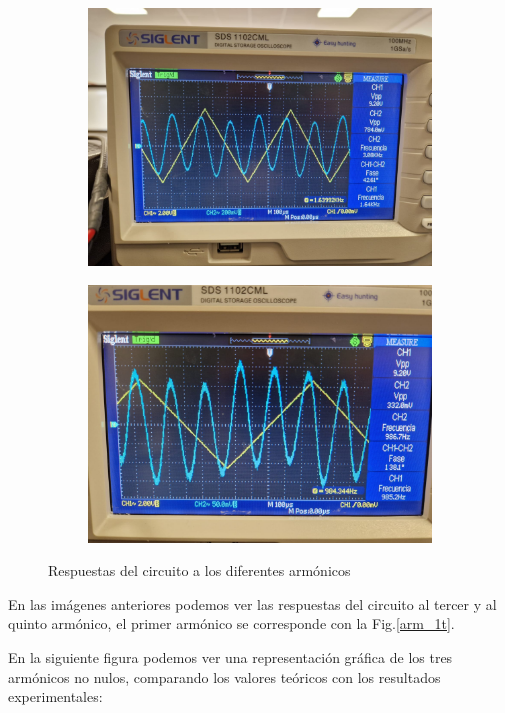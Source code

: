 \documentclass[a4paper,12pt,titlepage]{article}
\begin{document}
\begin{figure}[h!]
    \centering
    \begin{subfigure}{0.49\textwidth}
        \centering
        \includegraphics[width=0.8\linewidth]{fourier/onda triangular/triangular2.jpg}
    \end{subfigure}
    \begin{subfigure}{0.49\textwidth}
        \centering
        \includegraphics[width=0.8\linewidth]{fourier/onda triangular/triangular3.jpg}
    \end{subfigure}
    \caption{Respuestas del circuito a los diferentes armónicos}
    \label{fig:enter-label}
\end{figure}


En las imágenes anteriores podemos ver las respuestas del circuito al tercer y al quinto armónico, el primer armónico se corresponde con la Fig.\ref{arm_1t}.

En la siguiente figura podemos ver una representación gráfica de los tres armónicos no nulos, comparando los valores teóricos con los resultados experimentales:
\end{document}
